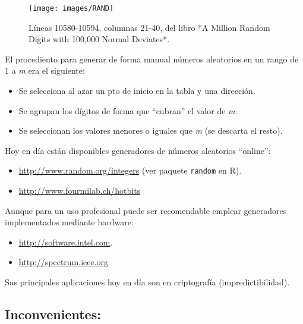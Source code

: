\documentclass[
]{book}
\theoremstyle{break}
\theoremstyle{definition}
\theoremstyle{definition}
\theoremstyle{definition}
\theoremstyle{remark}
\begin{document}
\begin{figure}[!htb]

{\centering \texttt{[image: images/RAND]} 

}

\caption{Líneas 10580-10594, columnas 21-40, del libro *A Million Random Digits with 100,000 Normal Deviates*.}\label{fig:randbook}
\end{figure}

El procediento para generar de forma manual números aleatorios
en un rango de 1 a \emph{m} era el siguiente:

\begin{itemize}
\item
  Se selecciona al azar un pto de inicio en la tabla
  y una dirección.
\item
  Se agrupan los dígitos de forma que ``cubran'' el valor de \emph{m}.
\item
  Se seleccionan los valores menores o iguales que \emph{m}
  (se descarta el resto).
\end{itemize}

Hoy en día están disponibles generadores de números aleatorios ``online'':

\begin{itemize}
\item
  \url{http://www.random.org/integers}
  (ver paquete \texttt{random} en R).
\item
  \url{http://www.fourmilab.ch/hotbits}
\end{itemize}

Aunque para un uso profesional puede ser recomendable emplear generadores implementados mediante hardware:

\begin{itemize}
\item
  \href{http://software.intel.com/en-us/articles/intel-digital-random-number-generator-drng-software-implementation-guide}{http://software.intel.com}.
\item
  \href{http://spectrum.ieee.org/semiconductors/devices/a-memristor-true-randomnumber-generator}{http://spectrum.ieee.org}
\end{itemize}

Sus principales aplicaciones hoy en día son en criptografía (impredictibilidad).

\hypertarget{inconvenientes}{%
\subsection{Inconvenientes:}\label{inconvenientes}}
\end{document}
